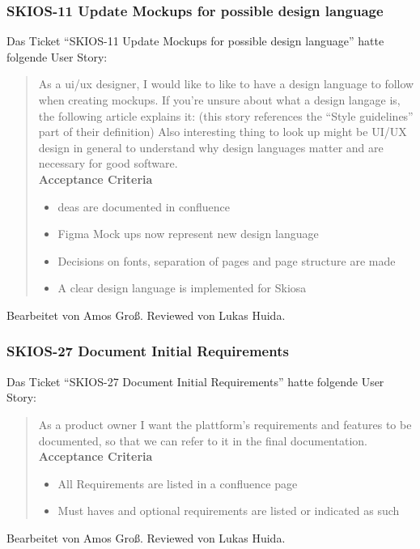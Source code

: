 \subsubsection{SKIOS-11 Update Mockups for possible design language}
Das Ticket \enquote{SKIOS-11 Update Mockups for possible design language} hatte folgende User Story:
\begin{quotation}
    As a ui/ux designer, I would like to like to have a design language to follow when creating mockups.
    If you're unsure about what a design langage is, the following article explains it:  (this story references the \enquote{Style guidelines} part of their definition)
    Also interesting thing to look up might be UI/UX design in general to understand why design languages matter and are necessary for good software. \\
\textbf{Acceptance Criteria}
\begin{itemize}
    \item deas are documented in confluence
    \item Figma Mock ups now represent new design language
    \item Decisions on fonts, separation of pages and page structure are made
    \item A clear design language is implemented for Skiosa
\end{itemize}
\end{quotation}
Bearbeitet von Amos Groß.
Reviewed von Lukas Huida.

\subsubsection{SKIOS-27 Document Initial Requirements}
Das Ticket \enquote{SKIOS-27 Document Initial Requirements} hatte folgende User Story:
\begin{quotation}
    As a product owner I want the plattform's requirements and features to be documented, so that we can refer to it in the final documentation. \\
\textbf{Acceptance Criteria}
\begin{itemize}
    \item All Requirements are listed in a confluence page
    \item Must haves and optional requirements are listed or indicated as such
\end{itemize}
\end{quotation}
Bearbeitet von Amos Groß.
Reviewed von Lukas Huida.

